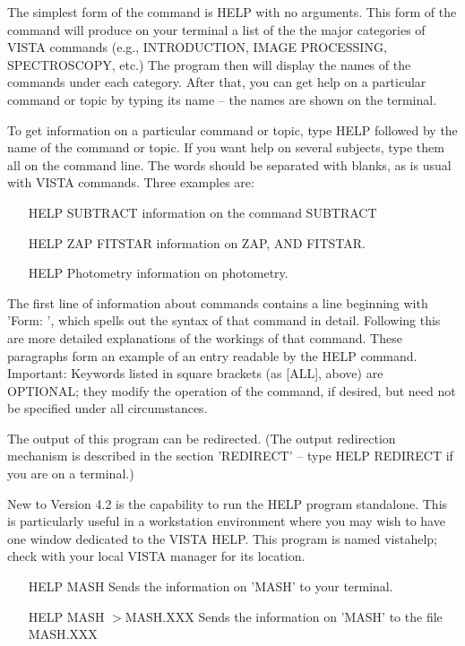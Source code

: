 The simplest form of the command is HELP with no arguments.  This form of
the command will produce on your terminal a list of the the major
categories of VISTA commands (e.g., INTRODUCTION, IMAGE PROCESSING,
SPECTROSCOPY, etc.)  The program then will display the names of the
commands under each category.  After that, you can get help on a particular
command or topic by typing its name -- the names are shown on the terminal.

To get information on a particular command or topic, type HELP followed by
the name of the command or topic.  If you want help on several subjects,
type them all on the command line.  The words should be separated with
blanks, as is usual with VISTA commands. Three examples are:
\begin{itemize}
   \item[HELP SUBTRACT \hfill]{information on the command SUBTRACT}
   \item[HELP ZAP FITSTAR \hfill]{information on ZAP, AND FITSTAR.}
   \item[HELP Photometry \hfill]{information on photometry.}
\end{itemize}

The first line of information about commands contains a line beginning with
'Form: ', which spells out the syntax of that command in detail.  Following
this are more detailed explanations of the workings of that command.  These
paragraphs form an example of an entry readable by the HELP command.
Important: Keywords listed in square brackets (as [ALL], above) are
OPTIONAL; they modify the operation of the command, if desired, but need
not be specified under all circumstances.

The output of this program can be redirected. (The output redirection
mechanism is described in the section 'REDIRECT' -- type HELP REDIRECT if
you are on a terminal.)  

New to Version 4.2 is the capability to run the HELP program standalone.
This is particularly useful in a workstation environment where you may wish
to have one window dedicated to the VISTA HELP. This program is named
vistahelp; check with your local VISTA manager for its location.


\begin{itemize}
   \item[HELP MASH\hfill]{Sends the information on 'MASH'
        to your terminal.}
   \item[HELP MASH $>$MASH.XXX\hfill]{Sends the information on 'MASH'
        to the file MASH.XXX}
\end{itemize}

